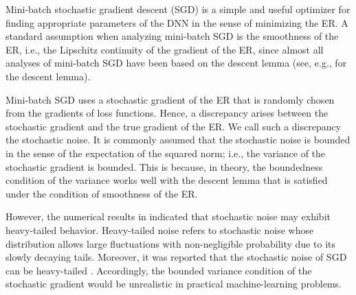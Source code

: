 \documentclass[twoside,11pt]{article}
\begin{document}
Mini-batch stochastic gradient descent (SGD) \citep{robb1951,zinkevich2003,nem2009,gha2012,gha2013,umeda2025increasing} is a simple and useful optimizer for finding appropriate parameters of the DNN in the sense of minimizing the ER. A standard assumption when analyzing mini-batch SGD is the smoothness of the ER, i.e., the Lipschitz continuity of the gradient of the ER, since almost all analyses of mini-batch SGD have been based on the descent lemma (see, e.g., \citep[Lemma 5.7]{beck2017} for the descent lemma).

Mini-batch SGD uses a stochastic gradient of the ER that is randomly chosen from the gradients of loss functions. Hence, a discrepancy arises between the stochastic gradient and the true gradient of the ER. We call such a discrepancy the stochastic noise. It is commonly assumed that the stochastic noise is bounded in the sense of the expectation of the squared norm; i.e., the variance of the stochastic gradient is bounded. This is because, in theory, the boundedness condition of the variance works well with the descent lemma that is satisfied under the condition of smoothness of the ER.

However, the numerical results in \citep{pmlr-v97-simsekli19a,pmlr-v139-garg21b,pmlr-v238-battash24a,ahn2024linear} indicated that stochastic noise may exhibit heavy-tailed behavior. Heavy-tailed noise refers to stochastic noise whose distribution allows large fluctuations with non-negligible probability due to its slowly decaying tails. Moreover, it was reported that the stochastic noise of SGD can be heavy-tailed \citep{NEURIPS2020_abd1c782,pmlr-v139-hodgkinson21a,liu2025nonconvex}. Accordingly, the bounded variance condition of the stochastic gradient would be unrealistic in practical machine-learning problems. 
\end{document}
